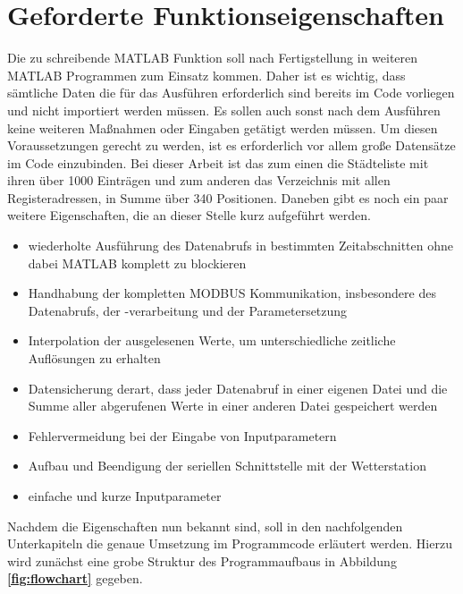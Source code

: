 \section{Geforderte Funktionseigenschaften}
Die zu schreibende MATLAB Funktion soll nach Fertigstellung in weiteren MATLAB Programmen zum Einsatz kommen. Daher ist es wichtig, dass sämtliche Daten die für das Ausführen erforderlich sind bereits im Code vorliegen und nicht importiert werden müssen. Es sollen auch sonst nach dem Ausführen keine weiteren Maßnahmen oder Eingaben getätigt werden müssen. Um diesen Voraussetzungen gerecht zu werden, ist es erforderlich vor allem große Datensätze im Code einzubinden.\label{createstruct} Bei dieser Arbeit ist das zum einen die Städteliste mit ihren über 1000 Einträgen und zum anderen das Verzeichnis mit allen Registeradressen, in Summe über 340 Positionen. Daneben gibt es noch ein paar weitere Eigenschaften, die an dieser Stelle kurz aufgeführt werden.
\begin{itemize}
\item wiederholte Ausführung des Datenabrufs in bestimmten Zeitabschnitten ohne dabei MATLAB komplett zu blockieren
\item Handhabung der kompletten MODBUS Kommunikation, insbesondere des Datenabrufs, der -verarbeitung und der Parametersetzung
\item Interpolation der ausgelesenen Werte, um unterschiedliche zeitliche Auflösungen zu erhalten
\item Datensicherung derart, dass jeder Datenabruf in einer eigenen Datei und die Summe aller abgerufenen Werte in einer anderen Datei gespeichert werden
\item Fehlervermeidung bei der Eingabe von Inputparametern
\item Aufbau und Beendigung der seriellen Schnittstelle mit der Wetterstation
\item einfache und kurze Inputparameter
\end{itemize}
Nachdem die Eigenschaften nun bekannt sind, soll in den nachfolgenden Unterkapiteln die genaue Umsetzung im Programmcode erläutert werden. Hierzu wird zunächst eine grobe Struktur des Programmaufbaus in Abbildung \textbf{\ref{fig:flowchart}} gegeben. 
